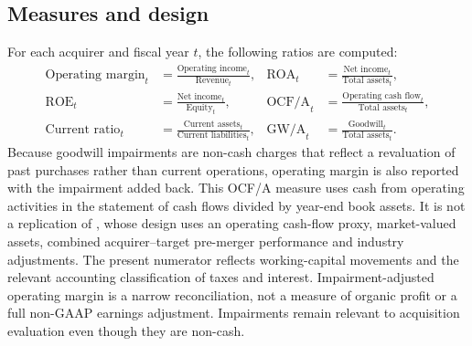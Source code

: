 \documentclass[11pt]{article}
\begin{document}
\subsection{Measures and design}

For each acquirer and fiscal year $t$, the following ratios are computed:
\begin{align}
\text{Operating margin}_t &= \frac{\text{Operating income}_t}{\text{Revenue}_t}, &
\text{ROA}_t &= \frac{\text{Net income}_t}{\text{Total assets}_t}, \nonumber\\
\text{ROE}_t &= \frac{\text{Net income}_t}{\text{Equity}_t}, &
\text{OCF/A}_t &= \frac{\text{Operating cash flow}_t}{\text{Total assets}_t}, \nonumber\\
\text{Current ratio}_t &= \frac{\text{Current assets}_t}{\text{Current liabilities}_t}, &
\text{GW/A}_t &= \frac{\text{Goodwill}_t}{\text{Total assets}_t}. \label{eq:ratios}
\end{align}
Because goodwill impairments are non-cash charges that reflect a revaluation of past purchases rather than current operations, operating margin is also reported with the impairment added back. This OCF/A measure uses cash from operating activities in the statement of cash flows divided by year-end book assets. It is not a replication of \citet{healy1992}, whose design uses an operating cash-flow proxy, market-valued assets, combined acquirer--target pre-merger performance and industry adjustments. The present numerator reflects working-capital movements and the relevant accounting classification of taxes and interest. Impairment-adjusted operating margin is a narrow reconciliation, not a measure of organic profit or a full non-GAAP earnings adjustment. Impairments remain relevant to acquisition evaluation even though they are non-cash.
\end{document}
